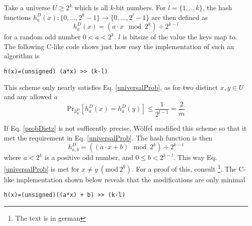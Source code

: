\documentclass[../../main.tex]{subfiles}
\begin{document}
\noindent Take a universe $U\geq 2^k$ which is all $k$-bit numbers. For $l=\{1,..,k\}$, the hash functions $h_a^D(x):\{0,...,2^k-1\}\rightarrow\{0,...,2^l-1\}$ are then defined as
\begin{equation}\label{dietzhash}
h_a^D(x)=(a\cdot x \mod 2^k) \div 2^{k-l}
\end{equation}
\noindent for a random odd number $0<a<2^k$. $l$ is bitsize of the value the keys map to. The following C-like code shows just how easy the implementation of such an algorithm is
\begin{lstlisting}
h(x)=(unsigned) (a*x) >> (k-l)
\end{lstlisting} 

This scheme only nearly satisfies Eq. \ref{universalProb}, as for two distinct $x,y\in U$ and any allowed $a$
\begin{equation}\label{probDietz}
\mathrm{Pr}_{h_a^D}[h_a^D(x)=h_a^D(y)]\leq \frac{1}{2^{l-1}}=\frac{2}{m}
\end{equation}

If Eq. \ref{probDietz} is not sufficently precise, Wölfel \cite[p.18-19]{multiplyshiftTruly} modified this scheme so that it met the requirement in Eq. \ref{universalProb}. The hash function is then
$$
h_{a,b}^{D}=((a\cdot x + b) \mod 2^k)\div 2^{k-l} 
$$
where $a<2^k$ is a positive odd number, and $0\leq b<2^{k-l}$. This way Eq. \ref{universalProb} is met for $x\neq y \ (\mathrm{mod}\ 2^k)$. For a proof of this, consult \cite{multiplyshiftTruly}\footnote{The text is in german}. The C-like implementation shown below reveals that the modifications are only minimal

\begin{lstlisting}
h(x)=(unsigned)((a*x) + b) >> (k-l)
\end{lstlisting}
\end{document}

